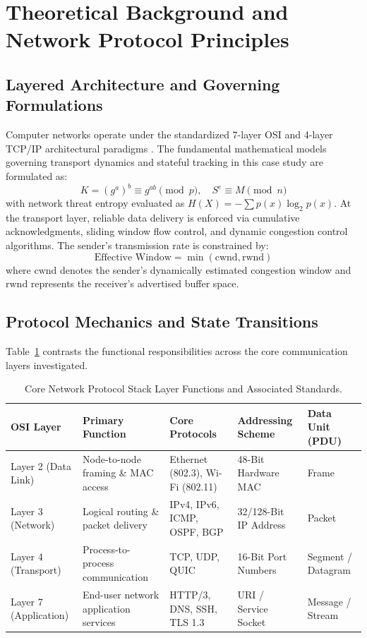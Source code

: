 \section{Theoretical Background and Network Protocol Principles}

\subsection{Layered Architecture and Governing Formulations}
Computer networks operate under the standardized 7-layer OSI and 4-layer TCP/IP architectural paradigms \cite{stallings2017data}. The fundamental mathematical models governing transport dynamics and stateful tracking in this case study are formulated as:
\begin{equation}
  K = (g^a)^b \equiv g^{ab} \pmod p, \quad S^e \equiv M \pmod n
\label{eq:core_math}
\end{equation}
with network threat entropy evaluated as $H(X) = -\sum p(x) \log_2 p(x)$.
At the transport layer, reliable data delivery is enforced via cumulative acknowledgments, sliding window flow control, and dynamic congestion control algorithms. The sender's transmission rate is constrained by:
\begin{equation}
  \text{Effective Window} = \min(\text{cwnd}, \text{rwnd})
\end{equation}
where $\text{cwnd}$ denotes the sender's dynamically estimated congestion window and $\text{rwnd}$ represents the receiver's advertised buffer space.

\subsection{Protocol Mechanics and State Transitions}
Table~\ref{tab:layer_comp} contrasts the functional responsibilities across the core communication layers investigated.
\begin{table}[H]
\centering
\caption{Core Network Protocol Stack Layer Functions and Associated Standards.}
\label{tab:layer_comp}
\begin{tabularx}{\linewidth}{lXXXX}
\toprule
\textbf{OSI Layer} & \textbf{Primary Function} & \textbf{Core Protocols} & \textbf{Addressing Scheme} & \textbf{Data Unit (PDU)} \\
\midrule
Layer 2 (Data Link) & Node-to-node framing \& MAC access & Ethernet (802.3), Wi-Fi (802.11) & 48-Bit Hardware MAC & Frame \\
Layer 3 (Network) & Logical routing \& packet delivery & IPv4, IPv6, ICMP, OSPF, BGP & 32/128-Bit IP Address & Packet \\
Layer 4 (Transport) & Process-to-process communication & TCP, UDP, QUIC & 16-Bit Port Numbers & Segment / Datagram \\
Layer 7 (Application) & End-user network application services & HTTP/3, DNS, SSH, TLS 1.3 & URI / Service Socket & Message / Stream \\
\bottomrule
\end{tabularx}
\end{table}

